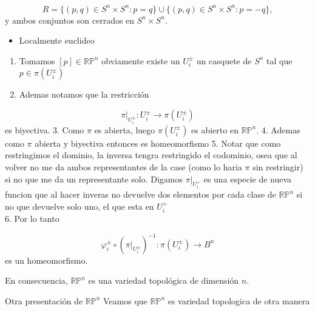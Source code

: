 \begin{bookproof}{}
\[
R=\{(p,q)\in S^n\times S^n:p=q\}\cup \{(p,q)\in S^n\times S^n:p=-q\},
\]
y ambos conjuntos son cerrados en $S^n\times S^n$.

\begin{itemize}
\item Localmente euclideo
\end{itemize}
\begin{enumerate}
\item Tomamos $[p] \in \mathbb{R}\mathbb{P}^{n}$ obviamente existe un $U_i^\pm$ un casquete de $S^n$ tal que $p \in \pi(U_{i}^{\pm})$
\item Ademas notamos que la restricción
\end{enumerate}
\[
\pi|_{U_i^\pm}:U_i^\pm\longrightarrow \pi(U_i^\pm)
\]
es biyectiva. 3. Como $\pi$ es abierta, luego $\pi(U_i^\pm)$ es abierto en $\mathbb{RP}^n$. 4. Ademas como $\pi$ abierta y biyectiva entonces es homeomorfismo 5. Notar que como restringimos el dominio, la inversa tengra restringido el codominio, osea que al volver no me da ambos representantes de la case (como lo haria $\pi$ sin restringir) si no que me da un representante solo. Digamos $\pi|_{U_{i}^{+}}$ es una especie de nueva funcion que al hacer inveras no devuelve dos elementos por cada clase de $\mathbb{R}\mathbb{P}^{n}$ si no que devuelve solo uno, el que esta en $U_{i}^{+}$\\
6. Por lo tanto

\[
\varphi_i^\pm\circ (\pi|_{U_i^\pm})^{-1}:\pi(U_i^\pm)\longrightarrow B^n
\]
es un homeomorfismo.

En consecuencia, $\mathbb{RP}^n$ es una variedad topológica de dimensión $n$.

\bookqed
\end{bookproof}
\begin{bookdefinition}{Otra presentación de $\mathbb{RP}^n$}
Veamos que $\mathbb{R}\mathbb{P}^{n}$ es variedad topologica de otra manera

\end{bookdefinition}
